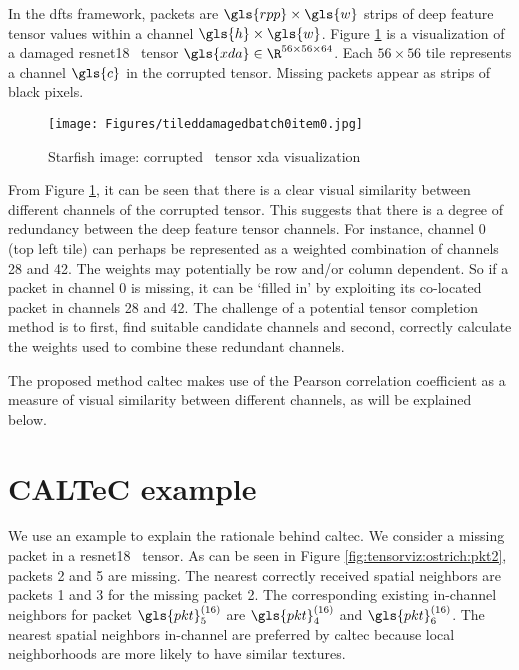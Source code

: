 In the \gls{dfts} framework, packets are $\gls{rpp} \times \gls{w}$ strips of deep feature tensor values within a channel $\gls{h} \times \gls{w}$. Figure \ref{fig:tensorviz:starfish:da} is a visualization of a damaged \gls{resnet18} \addone~tensor $\gls{xda} \in \R^{56 \times 56 \times 64}$. Each $56 \times 56$ tile represents a channel $\gls{c}$ in the corrupted tensor. Missing packets appear as strips of black pixels.

\begin{figure}[H]
	\centering
	\texttt{[image: Figures/tileddamagedbatch0item0.jpg]}
	\caption[Starfish damaged tensor visualization]{Starfish image: corrupted \addone~tensor \gls{xda} visualization}
	\label{fig:tensorviz:starfish:da}
\end{figure}

From Figure \ref{fig:tensorviz:starfish:da}, it can be seen that there is a clear visual similarity between different channels of the corrupted tensor. This suggests that there is a degree of redundancy between the deep feature tensor channels. For instance, channel 0 (top left tile) can perhaps be represented as a weighted combination of channels 28 and 42. The weights may potentially be row and/or column dependent. So if a packet in channel 0 is missing, it can be `filled in' by exploiting its co-located packet in channels 28 and 42. The challenge of a potential tensor completion method is to first, find suitable candidate channels and second, correctly calculate the weights used to combine these redundant channels.

The proposed method \gls{caltec} makes use of the Pearson correlation coefficient as a measure of visual similarity between different channels, as will be explained below.

\section{CALTeC example} \label{sec:caltec:ex}

We use an example to explain the rationale behind \gls{caltec}. We consider a missing packet in a \gls{resnet18} \addone~tensor. As can be seen in Figure \ref{fig:tensorviz:ostrich:pkt2}, packets 2 and 5 are missing. The nearest correctly received spatial neighbors are packets 1 and 3 for the missing packet 2. The corresponding existing in-channel neighbors for packet $\gls{pkt}_5^{(16)}$ are $\gls{pkt}_4^{(16)}$ and $\gls{pkt}_6^{(16)}$. The nearest spatial neighbors in-channel are preferred by \gls{caltec} because local neighborhoods are more likely to have similar textures.

